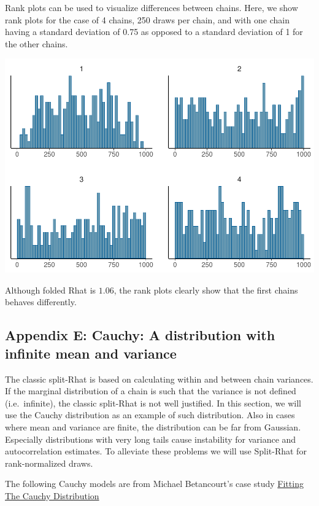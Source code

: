 \documentclass[american,]{article}
\begin{document}
Rank plots can be used to visualize differences between chains. Here, we
show rank plots for the case of 4 chains, 250 draws per chain, and with
one chain having a standard deviation of 0.75 as opposed to a standard
deviation of 1 for the other chains.

\includegraphics{graphics/hist-scaled-chain-1.pdf}

Although folded Rhat is \(1.06\), the rank plots clearly show that the
first chains behaves differently.

\hypertarget{AppendixE}{%
\subsection*{Appendix E: Cauchy: A distribution with infinite mean and
variance}\label{AppendixE}}

The classic split-Rhat is based on calculating within and between chain
variances. If the marginal distribution of a chain is such that the
variance is not defined (i.e.~infinite), the classic split-Rhat is not
well justified. In this section, we will use the Cauchy distribution as
an example of such distribution. Also in cases where mean and variance
are finite, the distribution can be far from Gaussian. Especially
distributions with very long tails cause instability for variance and
autocorrelation estimates. To alleviate these problems we will use
Split-Rhat for rank-normalized draws.

The following Cauchy models are from Michael Betancourt's case study
\href{https://betanalpha.github.io/assets/case_studies/fitting_the_cauchy.html}{Fitting
The Cauchy Distribution}
\end{document}
